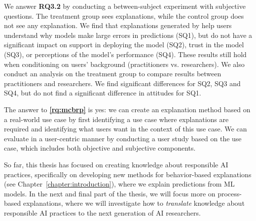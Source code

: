 We answer \textbf{RQ3.2} by conducting a between-subject experiment with subjective questions. 
The treatment group sees \OurMethod{} explanations, while the control group does not see any explanation. 
We find that explanations generated by \OurMethod{} help users understand why models make large errors in predictions (SQ1), but do not have a significant impact on support in deploying the model (SQ2), trust in the model (SQ3), or perceptions of the model's performance (SQ4). 
These results still hold when conditioning on users' background (practitioners vs. researchers). 
We also conduct an analysis on the treatment group to compare results between practitioners and researchers. 
We find significant differences for SQ2, SQ3 and SQ4, but do not find a significant difference in attitudes for SQ1. 

The answer to \textbf{\ref{rq:mcbrp}} is yes: we can create an explanation method based on a real-world use case by first identifying a use case where explanations are required and identifying what users want in the context of this use case. 
We can evaluate in a user-centric manner by conducting a user study based on the use case, which includes both objective and subjective components. 

So far, this thesis has focused on creating knowledge about responsible AI practices, specifically on developing new methods for behavior-based explanations (see Chapter~\ref{chapter:introduction}), where we explain predictions from ML models. 
In the next and final part of the thesis, we will focus more on process-based explanations, where we will investigate how to \emph{translate} knowledge about responsible AI practices to the next generation of AI researchers. 